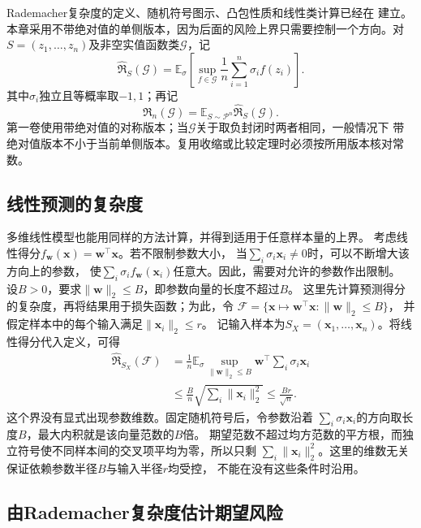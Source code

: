 Rademacher复杂度的定义、随机符号图示、凸包性质和线性类计算已经在
建立。本章采用不带绝对值的单侧版本，因为后面的风险上界只需要控制一个方向。对
$S=(z_1,\ldots,z_n)$及非空实值函数类$\mathcal G$，记
\begin{equation}
 \widehat{\mathfrak R}_S(\mathcal G)
 =\mathbb E_\sigma\left[\sup_{f\in\mathcal G}
       \frac1n\sum_{i=1}^n\sigma_i f(z_i)\right].
 \label{eq:learning-empirical-rademacher}
\end{equation}
其中$\sigma_i$独立且等概率取$-1,1$；再记
\[
 \mathfrak R_n(\mathcal G)=\mathbb E_{S\sim\mathcal P^n}
       \widehat{\mathfrak R}_S(\mathcal G).
\]
第一卷使用带绝对值的对称版本；当$\mathcal G$关于取负封闭时两者相同，一般情况下
带绝对值版本不小于当前单侧版本。复用收缩或比较定理时必须按所用版本核对常数。

\subsection{线性预测的复杂度}

多维线性模型也能用同样的方法计算，并得到适用于任意样本量的上界。
考虑线性得分$f_{\bm w}(\bm x)=\bm w^\top\bm x$。若不限制参数大小，
当$\sum_i\sigma_i\bm x_i\neq0$时，可以不断增大该方向上的参数，
使$\sum_i\sigma_i f_{\bm w}(\bm x_i)$任意大。因此，需要对允许的参数作出限制。
设$B>0$，要求$\|\bm w\|_2\leq B$，即参数向量的长度不超过$B$。
这里先计算预测得分的复杂度，再将结果用于损失函数；为此，令
$\mathcal F=\{\bm{x}\mapsto \bm{w}^\top \bm{x}:\lVert\bm{w}\rVert_2\leq B\}$，
并假定样本中的每个输入满足$\lVert\bm{x}_i\rVert_2\leq r$。
记输入样本为$S_X=(\bm x_1,\ldots,\bm x_n)$。将线性得分代入定义，可得
\begin{align}
 \widehat{\mathfrak R}_{S_X}(\mathcal F)
 &=\frac1n\mathbb E_\sigma\sup_{\lVert\bm{w}\rVert_2\leq B}
   \bm{w}^\top\sum_i\sigma_i \bm{x}_i\nonumber\\
 &\leq\frac{B}{n}\sqrt{\sum_i\lVert\bm{x}_i\rVert_2^2}
 \leq\frac{Br}{\sqrt n}.
 \label{eq:linear-rademacher-bound}
\end{align}
这个界没有显式出现参数维数。固定随机符号后，令参数沿着
$\sum_i\sigma_i\bm x_i$的方向取长度$B$，最大内积就是该向量范数的$B$倍。
期望范数不超过均方范数的平方根，而独立符号使不同样本间的交叉项平均为零，所以只剩
$\sum_i\lVert\bm x_i\rVert_2^2$。这里的维数无关保证依赖参数半径$B$与输入半径$r$均受控，
不能在没有这些条件时沿用。

\subsection{由Rademacher复杂度估计期望风险}

